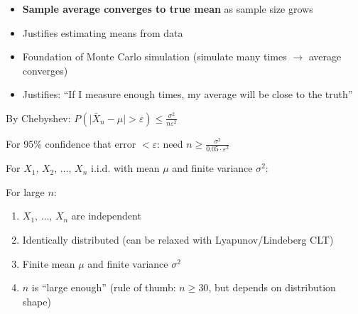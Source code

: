 
\begin{itemize}
\tightlist
\item
  \textbf{Sample average converges to true mean} as sample size grows
\item
  Justifies estimating means from data
\item
  Foundation of Monte Carlo simulation (simulate many times \ensuremath{\to} average converges)
\item
  Justifies: ``If I measure enough times, my average will be close to the truth''
\end{itemize}


By Chebyshev: $P(\lvert \bar{X}_{n} - \mu\rvert > \varepsilon) \le \frac{\sigma^{2}}{n\varepsilon^{2}}$

For 95\% confidence that error $< \varepsilon$: need $n \ge \frac{\sigma^{2}}{0.05 \cdot \varepsilon^{2}}$



For $X_{1},\, X_{2},\, \ldots,\, X_{n}$ i.i.d. with mean $\mu$ and finite variance $\sigma^{2}$:



For large $n$:



\begin{enumerate}
\def\labelenumi{\arabic{enumi}.}
\tightlist
\item
  $X_{1},\, \ldots,\, X_{n}$ are independent
\item
  Identically distributed (can be relaxed with Lyapunov/Lindeberg CLT)
\item
  Finite mean $\mu$ and finite variance $\sigma^{2}$
\item
  $n$ is ``large enough'' (rule of thumb: $n \ge 30$, but depends on distribution shape)
\end{enumerate}


